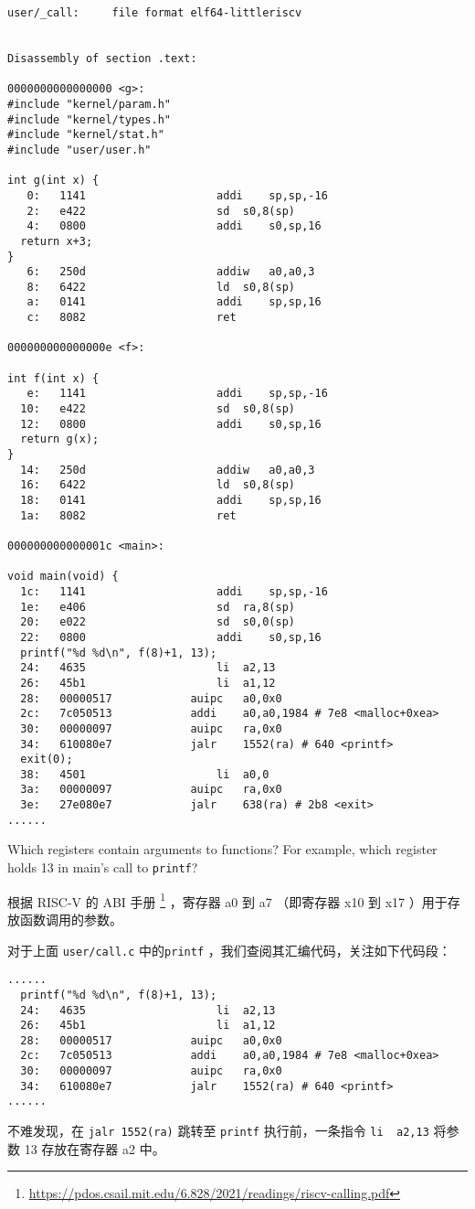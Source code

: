 \begin{lstlisting}
user/_call:     file format elf64-littleriscv


Disassembly of section .text:

0000000000000000 <g>:
#include "kernel/param.h"
#include "kernel/types.h"
#include "kernel/stat.h"
#include "user/user.h"

int g(int x) {
   0:	1141                	addi	sp,sp,-16
   2:	e422                	sd	s0,8(sp)
   4:	0800                	addi	s0,sp,16
  return x+3;
}
   6:	250d                	addiw	a0,a0,3
   8:	6422                	ld	s0,8(sp)
   a:	0141                	addi	sp,sp,16
   c:	8082                	ret

000000000000000e <f>:

int f(int x) {
   e:	1141                	addi	sp,sp,-16
  10:	e422                	sd	s0,8(sp)
  12:	0800                	addi	s0,sp,16
  return g(x);
}
  14:	250d                	addiw	a0,a0,3
  16:	6422                	ld	s0,8(sp)
  18:	0141                	addi	sp,sp,16
  1a:	8082                	ret

000000000000001c <main>:

void main(void) {
  1c:	1141                	addi	sp,sp,-16
  1e:	e406                	sd	ra,8(sp)
  20:	e022                	sd	s0,0(sp)
  22:	0800                	addi	s0,sp,16
  printf("%d %d\n", f(8)+1, 13);
  24:	4635                	li	a2,13
  26:	45b1                	li	a1,12
  28:	00000517          	auipc	a0,0x0
  2c:	7c050513          	addi	a0,a0,1984 # 7e8 <malloc+0xea>
  30:	00000097          	auipc	ra,0x0
  34:	610080e7          	jalr	1552(ra) # 640 <printf>
  exit(0);
  38:	4501                	li	a0,0
  3a:	00000097          	auipc	ra,0x0
  3e:	27e080e7          	jalr	638(ra) # 2b8 <exit>
......
\end{lstlisting}

\begin{exercise}
    Which registers contain arguments to functions? For example, which register holds 13 in main's call to \lstinline{printf}?
\end{exercise}

\begin{solution}
根据 RISC-V 的 ABI 手册 \footnote{\url{https://pdos.csail.mit.edu/6.828/2021/readings/riscv-calling.pdf}} ，寄存器 a0 到 a7 （即寄存器 x10 到 x17 ）用于存放函数调用的参数。

对于上面 \lstinline{user/call.c} 中的\lstinline{printf} ，我们查阅其汇编代码，关注如下代码段：
\begin{lstlisting}
......
  printf("%d %d\n", f(8)+1, 13);
  24:	4635                	li	a2,13
  26:	45b1                	li	a1,12
  28:	00000517          	auipc	a0,0x0
  2c:	7c050513          	addi	a0,a0,1984 # 7e8 <malloc+0xea>
  30:	00000097          	auipc	ra,0x0
  34:	610080e7          	jalr	1552(ra) # 640 <printf>
......
\end{lstlisting}

不难发现，在 \lstinline{jalr 1552(ra)} 跳转至 \lstinline{printf} 执行前，一条指令 \lstinline{li	a2,13} 将参数 13 存放在寄存器 a2 中。
\end{solution}

